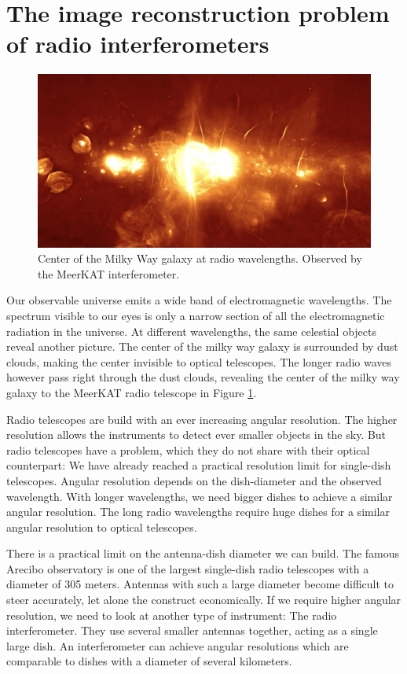 \section{The image reconstruction problem of radio interferometers}
\begin{figure}[h]
	\includegraphics[width=\linewidth]{./chapters/01.intro/MeerKAT_milkyWay.jpg}
	\caption{Center of the Milky Way galaxy at radio wavelengths. Observed by the MeerKAT interferometer.}
	\label{intro:milky}
\end{figure}

Our observable universe emits a wide band of electromagnetic wavelengths. The spectrum visible to our eyes is only a narrow section of all the electromagnetic radiation in the universe. At different wavelengths, the same celestial objects reveal another picture. The center of the milky way galaxy is surrounded by dust clouds, making the center invisible to optical telescopes. The longer radio waves however pass right through the dust clouds, revealing the center of the milky way galaxy to the MeerKAT radio telescope in Figure \ref{intro:milky}.

Radio telescopes are build with an ever increasing angular resolution. The higher resolution allows the instruments to detect ever smaller objects in the sky. But radio telescopes have a problem, which they do not share with their optical counterpart: We have already reached a practical resolution limit for single-dish telescopes. Angular resolution depends on the dish-diameter and the observed wavelength. With longer wavelengths, we need bigger dishes to achieve a similar angular resolution. The long radio wavelengths require huge dishes for a similar angular resolution to optical telescopes.

There is a practical limit on the antenna-dish diameter we can build. The famous Arecibo observatory is one of the largest single-dish radio telescopes with a diameter of 305 meters. Antennas with such a large diameter become difficult to steer accurately, let alone the construct economically. If we require higher angular resolution, we need to look at another type of instrument: The radio interferometer. They use several smaller antennas together, acting as a single large dish. An interferometer can achieve angular resolutions which are comparable to dishes with a diameter of several kilometers.

